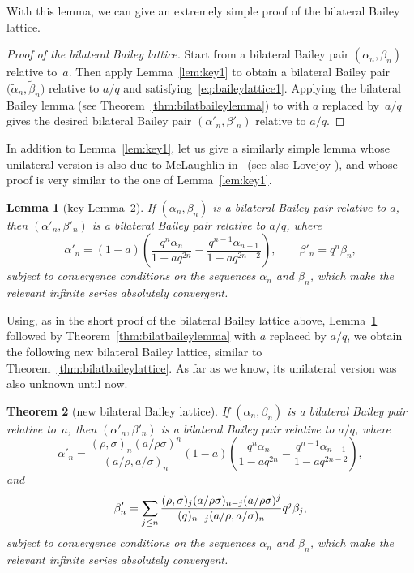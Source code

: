 \documentclass[11pt]{article}
\numberwithin{equation}{section}
\newtheorem{Theorem}{Theorem}[section]
\newtheorem{Lemma}[Theorem]{Lemma}
\begin{document}
With this lemma, we can give an extremely simple proof of the bilateral Bailey lattice.
\begin{proof}[Proof of the bilateral Bailey lattice]
Start from a bilateral Bailey pair $(\alpha_n, \beta_n)$ relative to~$a$. Then apply Lemma~\ref{lem:key1} to obtain a bilateral Bailey pair $\bigl(\tilde{\alpha}_n, \tilde{\beta}_n\bigr)$ relative to $a/q$ and satisfying~\eqref{eq:baileylattice1}. Applying the bilateral Bailey lemma (see Theorem~\ref{thm:bilatbaileylemma}) to  with $a$ replaced by~$a/q$ gives the desired bilateral Bailey pair $(\alpha'_n, \beta'_n)$ relative to $a/q$.
\end{proof}

In addition to Lemma~\ref{lem:key1}, let us give a similarly simple lemma whose unilateral version is also due to McLaughlin in~\cite[Lemma~13.1\,(2)]{M} (see also Lovejoy \cite[Lemma 3.1]{Lo22}), and whose proof is very similar to the one of Lemma~\ref{lem:key1}.

\begin{Lemma}[key Lemma~2]\label{lem:key2}
If $(\alpha_n, \beta_n)$ is a bilateral Bailey pair relative to $a$, then $(\alpha'_n, \beta'_n)$ is a bilateral Bailey pair relative to $a/q$, where
\[%
\alpha'_n=(1-a)\left(\frac{q^n\alpha_n}{1-aq^{2n}}-\frac{q^{n-1}\alpha_{n-1}}{1-aq^{2n-2}}\right), \qquad \beta'_n=q^n\beta_n,
\]
subject to convergence conditions on the sequences $\alpha_n$ and $\beta_n$, which make the relevant infinite series absolutely convergent.
\end{Lemma}

Using, as in the short proof of the bilateral Bailey lattice above, Lemma~\ref{lem:key2} followed by Theorem~\ref{thm:bilatbaileylemma} with $a$ replaced by $a/q$, we obtain the following new bilateral Bailey lattice, similar to Theorem~\ref{thm:bilatbaileylattice}. As far as we know, its unilateral version was also unknown until now.

\begin{Theorem}[new bilateral Bailey lattice]\label{thm:newbilatbaileylattice}
If $(\alpha_n, \beta_n)$ is a bilateral Bailey pair relative to~$a$, then $(\alpha'_n, \beta'_n)$ is a bilateral Bailey pair relative to $a/q$, where
\begin{equation*}\alpha'_n=\frac{(\rho,\sigma)_n(a/\rho\sigma)^n}{(a/\rho,a/\sigma)_n}(1-a)\left(\frac{q^n\alpha_n}{1-aq^{2n}}-\frac{q^{n-1}\alpha_{n-1}}{1-aq^{2n-2}}\right),
\end{equation*}
and
\begin{equation*}\beta'_n=\sum_{j\leq n}{(\rho,\sigma)_j(a/\rho\sigma)_{n-j}(a/\rho\sigma)^j\over (q)_{n-j}(a/\rho,a/\sigma)_n} q^j\beta_j,
\end{equation*}
subject to convergence conditions on the sequences $\alpha_n$ and $\beta_n$, which make the relevant infinite series absolutely convergent.
\end{Theorem}
\end{document}
